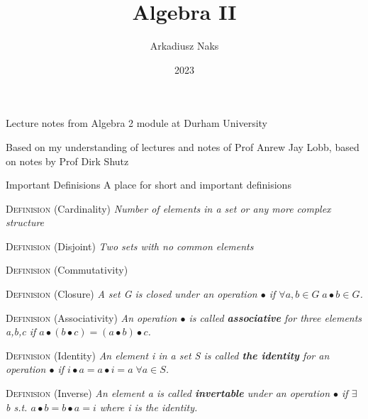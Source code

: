 \documentclass[12pt, letterpaper]{article}
\title{Algebra II}
\author{Arkadiusz Naks}
\date{2023}
\begin{document}
\begin{titlepage}
  \begin{center}
    \makeatletter
    \vspace*{1cm}
    \Huge
    \textbf{\@title}

    \vspace{0.5cm}
    \Large
    Lecture notes from Algebra 2 module at Durham University

    \vspace{1.5cm}

    \textbf{\@author}

    \vfill

    \vspace{0.8cm}

    \small
    Based on my understanding of lectures and notes of Prof Anrew Jay Lobb,
    based on notes by Prof Dirk Shutz\\
    \@date{}
  \end{center}
\end{titlepage}

\tableofcontents
\newpage

\begin{section}{Important Definisions}
  A place for short and important definisions

  \textsc{Definision} (Cardinality) \textit{Number of elements in a set or any
    more complex structure}

  \textsc{Definision} (Disjoint) \textit{Two sets with no common elements}

  \textsc{Definision} (Commutativity) \textit{}

  \textsc{Definision} (Closure) \textit{A set G is closed under an operation
    \(\bullet\) if \newline \(\forall a, b \in G \; a \bullet b \in G\).}

  \textsc{Definision} (Associativity) \textit{An operation \(\bullet\) is called
    \textbf{associative} for three elements a,b,c if
    \(a \bullet (b \bullet c) = (a \bullet b) \bullet c\).}

  \textsc{Definision} (Identity) \textit{An element i in a set S is called \textbf{the identity}
    for an operation \(\bullet\) if \(i \bullet a = a \bullet i = a \; \forall a \in S\).}

  \textsc{Definision} (Inverse) \textit{An element a is called \textbf{invertable} under an
    operation \(\bullet\) if \(\exists\) b s.t. \(a \bullet b = b \bullet a = i\) where
    i is the identity.}

\end{section}
\end{document}
